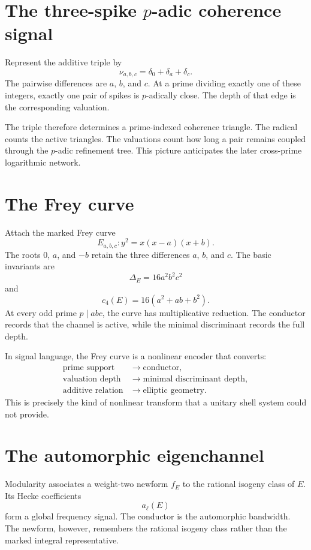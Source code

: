 \section{The three-spike \texorpdfstring{$p$-adic}{p-adic} coherence signal}
Represent the additive triple by
\[
 \nu_{a,b,c}=\delta_0+\delta_a+\delta_c.
\]
The pairwise differences are $a$, $b$, and $c$. At a prime dividing exactly one of these integers, exactly one pair of spikes is $p$-adically close. The depth of that edge is the corresponding valuation.

The triple therefore determines a prime-indexed coherence triangle. The radical counts the active triangles. The valuations count how long a pair remains coupled through the $p$-adic refinement tree. This picture anticipates the later cross-prime logarithmic network.

\section{The Frey curve}
Attach the marked Frey curve
\[
 \boxed{
 E_{a,b,c}:y^2=x(x-a)(x+b).
 }
\]
The roots $0$, $a$, and $-b$ retain the three differences $a$, $b$, and $c$. The basic invariants are
\[
 \Delta_E=16a^2b^2c^2
\]
and
\[
 c_4(E)=16(a^2+ab+b^2).
\]
At every odd prime $p\mid abc$, the curve has multiplicative reduction. The conductor records that the channel is active, while the minimal discriminant records the full depth.

In signal language, the Frey curve is a nonlinear encoder that converts:
\[
 \begin{aligned}
 \text{prime support}&\longrightarrow\text{conductor},\\
 \text{valuation depth}&\longrightarrow\text{minimal discriminant depth},\\
 \text{additive relation}&\longrightarrow\text{elliptic geometry}.
 \end{aligned}
\]
This is precisely the kind of nonlinear transform that a unitary shell system could not provide.

\section{The automorphic eigenchannel}
Modularity associates a weight-two newform $f_E$ to the rational isogeny class of $E$. Its Hecke coefficients
\[
 a_\ell(E)
\]
form a global frequency signal. The conductor is the automorphic bandwidth. The newform, however, remembers the rational isogeny class rather than the marked integral representative.

